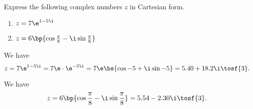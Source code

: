 \begin{problem}
    Express the following complex numbers $z$ in Cartesian form.

    \begin{enumerate}
        \item $z = 7\e^{1 - 5\i}$
        \item $z = 6\bp{\cos \frac\pi8 - \i\sin\frac\pi8}$
    \end{enumerate}
\end{problem}
\begin{solution}
    \begin{ppart}
        We have \[z = 7\e^{1-5\i} = 7\e \cdot \e^{-5\i} = 7\e \bs{\cos{-5} + \i\sin{-5}} = 5.40 + 18.2\i \tosf{3}.\]
    \end{ppart}
    \begin{ppart}
        We have \[z = 6\bp{\cos \frac\pi8 - \i\sin\frac\pi8} = 5.54 - 2.30\i \tosf{3}.\]
    \end{ppart}
\end{solution}


